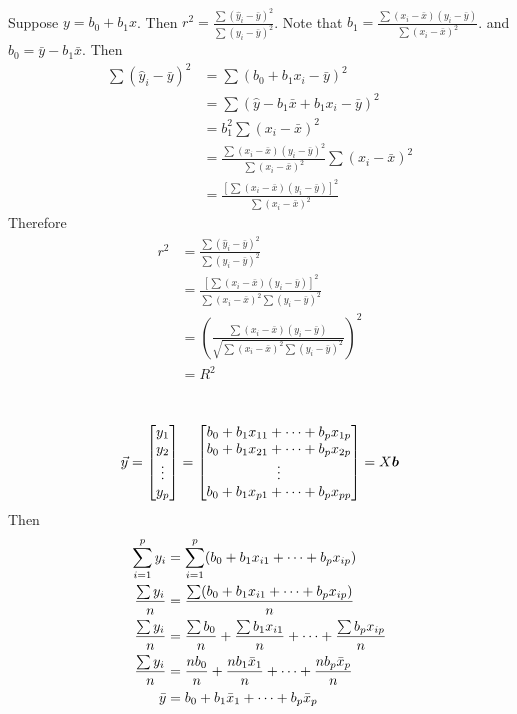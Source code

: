 \documentclass[12pt]{article}
\begin{document}
\begin{enumerate}
\newpage
{} \\
Suppose $y = b_0 + b_1x$. Then $r^2 = \frac{\sum (\hat{y}_i - \bar{y})^2}{\sum (y_i - \bar{y})^2}$. Note that $b_1 = \frac{\sum (x_i - \bar{x})(y_i - \bar{y})}{\sum (x_i - \bar{x})^2}$. and $b_0 = \bar{y} - b_1\bar{x}$. Then $$ \begin{aligned} \sum (\hat{y}_i - \bar{y})^2 &= \sum (b_0 + b_1x_i - \bar{y})^2 \\ &= \sum (\hat{y} - b_1\bar{x} + b_1x_i - \bar{y})^2 \\ &= b_1^2 \sum (x_i - \bar{x})^2 \\ &= \frac{\sum (x_ i -\bar{x})(y_i - \bar{y})^2}{\sum (x_i - \bar{x})^2} \sum (x_i - \bar{x})^2 \\ &= \frac{[\sum (x_i - \bar{x})(y_i - \bar{y})]^2}{\sum (x_i - \bar{x})^2} \end{aligned} $$ 
Therefore $$ \begin{aligned} r^2 &= \frac{\sum (\hat{y}_i - \bar{y})^2}{\sum (y_i - \bar{y})^2} \\ &= \frac{[\sum (x_i - \bar{x})(y_i - \bar{y})]^2}{\sum (x_i - \bar{x})^2 \sum (y_i - \bar{y})^2} \\ &= \left( \frac{\sum (x_i - \bar{x})(y_i - \bar{y})}{\sqrt{\sum (x_i - \bar{x})^2 \sum (y_i - \bar{y})^2}}\right)^2 \\ &= R^2 \end{aligned} $$ 

 \\
$$\vec{y} = \begin{bmatrix} y_1 \\ y_2 \\ \vdots \\ y_p \end{bmatrix} = \begin{bmatrix} b_0 + b_1x_{11} + \dots + b_px_{1p} \\ b_0 + b_1x_{21} + \dots + b_px_{2p} \\ \vdots \\ b_0 + b_1x_{p1} + \dots + b_px_{pp} \end{bmatrix} = X\boldsymbol{b} $$ 
Then $$ \begin{aligned} \sum_{i=1}^p y_i &= \sum_{i=1}^p (b_0 + b_1x_{i1} + \dots + b_px_{ip}) \\ \frac{ \sum y_i }{n} &= \frac{\sum (b_0 + b_1x_{i1} + \dots + b_px_{ip})}{n} \\
\frac{\sum y_i}{n} &= \frac{\sum b_0}{n} + \frac{\sum b_1x_{i1}}{n} + \dots + \frac{\sum b_px_{ip}}{n} \\ \frac{\sum y_i}{n} &= \frac{nb_0}{n} + \frac{nb_1\bar{x}_1}{n} + \dots + \frac{nb_p\bar{x}_p}{n} \\ \bar{y} &= b_0 + b_1\bar{x}_1 + \dots + b_p\bar{x}_p \end{aligned} $$ 

\end{enumerate}
\end{document}
